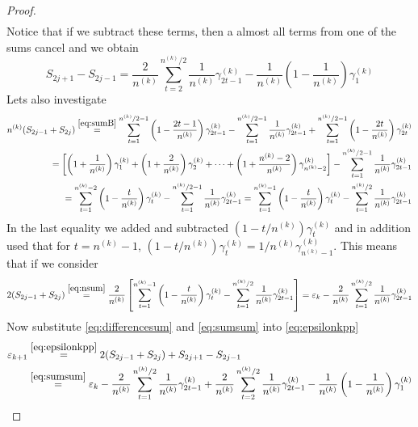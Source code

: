 \documentclass[11pt,english,a4paper]{article}
\begin{document}
\begin{prop}
\begin{proof}
\begin{align}
\end{align}
Notice that if we subtract these terms, then a almost all terms from one of the sums cancel and we obtain
\begin{equation}
S_{2j+1} - S_{2j-1} = \frac{2}{n^{(k)}} \sum_{t=2}^{n^{(k)}/2} \frac{1}{n^{(k)}} \gamma^{(k)}_{2t - 1} - \frac{1}{n^{(k)}}\left( 1 - \frac{1}{n^{(k)}} \right) \gamma^{(k)}_{1} \label{eq:differencesum}
\end{equation}
Lets also investigate
\begin{align}
n^{(k)}(S_{2j-1} + S_{2j}) \stackrel{\eqref{eq:sumB} }{=} \sum_{t=1}^{n^{(k)}/2-1} \left( 1 - \frac{2t-1}{n^{(k)}}\right) \gamma^{(k)}_{2t - 1} -  \sum_{t=1}^{n^{(k)}/2-1} \frac{1}{n^{(k)}} \gamma^{(k)}_{2t - 1} + \sum_{t=1}^{n^{(k)}/2-1} \left( 1 - \frac{2t}{n^{(k)}}\right) \gamma^{(k)}_{2t}\nonumber\\
=\left[ \left(1 + \frac{1}{n^{(k)}}\right)\gamma^{(k)}_1 + \left(1 + \frac{2}{n^{(k)}}\right)\gamma^{(k)}_2  + \cdots + \left(1 + \frac{n^{(k)} - 2}{n^{(k)}} \right)\gamma^{(k)}_{n^{(k)} -2 }\right]-  \sum_{t=1}^{n^{(k)}/2-1} \frac{1}{n^{(k)}} \gamma^{(k)}_{2t - 1} \nonumber\\
= \sum_{t=1}^{n^{(k)} -2 } \left( 1 - \frac{t}{n^{(k)}} \right)\gamma^{(k)}_{t}-  \sum_{t=1}^{n^{(k)}/2-1} \frac{1}{n^{(k)}} \gamma^{(k)}_{2t - 1} = \sum_{t=1}^{n^{(k)} -1 } \left( 1 - \frac{t}{n^{(k)}} \right)\gamma^{(k)}_{t} -  \sum_{t=1}^{n^{(k)}/2} \frac{1}{n^{(k)}} \gamma^{(k)}_{2t - 1} \label{eq:nsum}
\end{align}
In the last equality we added and subtracted $(1-t/n^{(k)})\gamma^{(k)}_{t}$ and in addition used that for $t = n^{(k)} - 1$, $(1-t/n^{(k)})\gamma^{(k)}_{t} = 1/n^{(k)}\gamma^{(k)}_{n^{(k)} -1}$. This means that if we consider
\begin{align}
2(S_{2j-1} + S_{2j}) \stackrel{\eqref{eq:nsum}}{=} \frac{2}{n^{(k)}} \left[ \sum_{t=1}^{n^{(k)} -1 } \left( 1 - \frac{t}{n^{(k)}} \right)\gamma^{(k)}_{t} -  \sum_{t=1}^{n^{(k)}/2} \frac{1}{n^{(k)}} \gamma^{(k)}_{2t - 1} \right] = \varepsilon_k -\frac{2}{n^{(k)}} \sum_{t=1}^{n^{(k)}/2} \frac{1}{n^{(k)}} \gamma^{(k)}_{2t - 1} \label{eq:sumsum}
\end{align}
Now substitute \eqref{eq:differencesum} and \eqref{eq:sumsum} into \eqref{eq:epsilonkpp}
\begin{align*}
\varepsilon_{  k+1} &\stackrel{\eqref{eq:epsilonkpp}}{=} 2(S_{2j-1} + S_{2j}) + S_{2j+1} - S_{2j-1} \\
&\stackrel{\eqref{eq:sumsum}}{=} \varepsilon_k -\frac{2}{n^{(k)}} \sum_{t=1}^{n^{(k)}/2} \frac{1}{n^{(k)}} \gamma^{(k)}_{2t - 1}  + \frac{2}{n^{(k)}} \sum_{t=2}^{n^{(k)}/2} \frac{1}{n^{(k)}} \gamma^{(k)}_{2t - 1} - \frac{1}{n^{(k)}}\left( 1 - \frac{1}{n^{(k)}} \right) \gamma^{(k)}_{1}\\

\end{align*}
\end{proof}
\end{prop}
\end{document}
